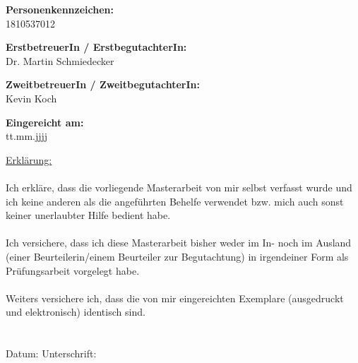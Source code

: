 \begin{center}
\hspace*{-1.0cm} \textbf{Personenkennzeichen:}\\
\vspace{0.2cm}
\hspace*{-1.0cm} 1810537012 \\

\vspace{0.7cm}

\hspace*{-1.0cm} \textbf{ErstbetreuerIn / ErstbegutachterIn:} \\
\vspace{0.2cm}
\hspace*{-1.0cm} Dr. Martin Schmiedecker \\

\vspace{0.7cm}

\hspace*{-1.0cm} \textbf{ZweitbetreuerIn / ZweitbegutachterIn:} \\
\vspace{0.2cm}
\hspace*{-1.0cm} Kevin Koch \\


\vspace{0.7cm}

\hspace*{-1.0cm} \textbf{Eingereicht am:} \\
\vspace{0.2cm}
\hspace*{-1.0cm} tt.mm.jjjj \\

\end{center}

\newpage

\pagestyle{empty}

\vspace*{15.6cm}

\hspace*{-0.7cm} \underline{Erklärung:}\\\\
Ich erkläre, dass die vorliegende Masterarbeit von mir selbst verfasst wurde und ich keine anderen als die angeführten Behelfe verwendet bzw. mich auch sonst keiner unerlaubter Hilfe bedient habe.\\\\
Ich versichere, dass ich diese Masterarbeit bisher weder im In- noch im Ausland (einer Beurteilerin/einem Beurteiler zur Begutachtung) in irgendeiner Form als Prüfungsarbeit vorgelegt habe.\\\\
Weiters versichere ich, dass die von mir eingereichten Exemplare (ausgedruckt und elektronisch) identisch sind.
\\\\\\
Datum: \hspace{6cm} Unterschrift:\\






